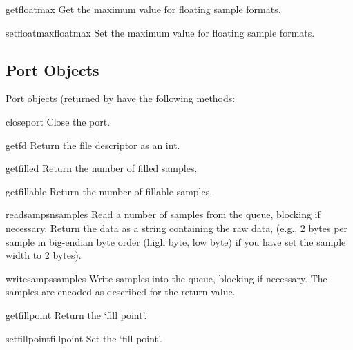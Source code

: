 \begin{funcdesc}{getfloatmax}{}
Get the maximum value for floating sample formats.
\end{funcdesc}

\begin{funcdesc}{setfloatmax}{floatmax}
Set the maximum value for floating sample formats.
\end{funcdesc}

\subsection{Port Objects}

Port objects (returned by  have the following
methods:

\renewcommand{\indexsubitem}{(audio port object method)}

\begin{funcdesc}{closeport}{}
Close the port.
\end{funcdesc}

\begin{funcdesc}{getfd}{}
Return the file descriptor as an int.
\end{funcdesc}

\begin{funcdesc}{getfilled}{}
Return the number of filled samples.
\end{funcdesc}

\begin{funcdesc}{getfillable}{}
Return the number of fillable samples.
\end{funcdesc}

\begin{funcdesc}{readsamps}{nsamples}
Read a number of samples from the queue, blocking if necessary.
Return the data as a string containing the raw data, (e.g., 2 bytes per
sample in big-endian byte order (high byte, low byte) if you have set
the sample width to 2 bytes).
\end{funcdesc}

\begin{funcdesc}{writesamps}{samples}
Write samples into the queue, blocking if necessary.  The samples are
encoded as described for the  return value.
\end{funcdesc}

\begin{funcdesc}{getfillpoint}{}
Return the `fill point'.
\end{funcdesc}

\begin{funcdesc}{setfillpoint}{fillpoint}
Set the `fill point'.
\end{funcdesc}

